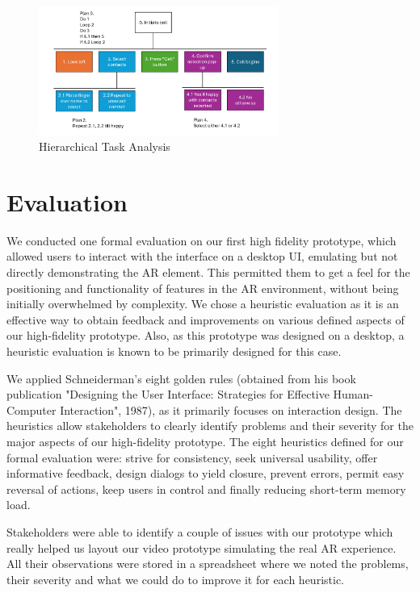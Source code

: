 \documentclass[12pt,a4paper]{article}
\begin{document}
\begin{figure}[H]  
  \centering
  \includegraphics[width=0.7\textwidth]{hta.png}  
  \caption{Hierarchical Task Analysis}
  \label{fig:hta}  
\end{figure}


\section{Evaluation}

We conducted one formal evaluation on our first high fidelity prototype, which allowed users to interact with the interface on a desktop UI, emulating but not directly demonstrating the AR element. This permitted them to get a feel for the positioning and functionality of features in the AR environment, without being initially overwhelmed by complexity. We chose a heuristic evaluation as it is an effective way to obtain feedback and improvements on various defined aspects of our high-fidelity prototype. Also, as this prototype was designed on a desktop, a heuristic evaluation is known to be primarily designed for this case.  

We applied Schneiderman’s eight golden rules (obtained from his book publication "Designing the User Interface: Strategies for Effective Human-Computer Interaction", 1987), as it primarily focuses on interaction design. The heuristics allow stakeholders to clearly identify problems and their severity for the major aspects of our high-fidelity prototype. The eight heuristics defined for our formal evaluation were: strive for consistency, seek universal usability, offer informative feedback, design dialogs to yield closure, prevent errors, permit easy reversal of actions, keep users in control and finally reducing short-term memory load.  

Stakeholders were able to identify a couple of issues with our prototype which really helped us layout our video prototype simulating the real AR experience. All their observations were stored in a spreadsheet where we noted the problems, their severity and what we could do to improve it for each heuristic.  
\end{document}
